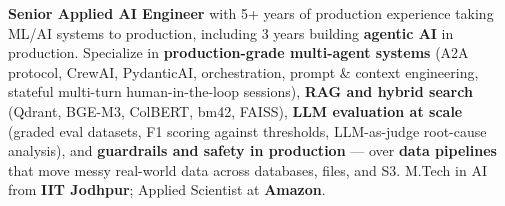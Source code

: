 \documentclass[letter,10pt]{article}
\begin{document}

\textbf{Senior Applied AI Engineer} with 5+ years of production experience taking ML/AI systems to production, including 3 years building \textbf{agentic AI} in production.
Specialize in \textbf{production-grade multi-agent systems} (A2A protocol, CrewAI, PydanticAI, orchestration, prompt \& context engineering, stateful multi-turn human-in-the-loop sessions), \textbf{RAG and hybrid search} (Qdrant, BGE-M3, ColBERT, bm42, FAISS), \textbf{LLM evaluation at scale} (graded eval datasets, F1 scoring against thresholds, LLM-as-judge root-cause analysis), and \textbf{guardrails and safety in production} — over \textbf{data pipelines} that move messy real-world data across databases, files, and S3.
M.Tech in AI from \textbf{IIT Jodhpur}; Applied Scientist at \textbf{Amazon}.
\end{document}
